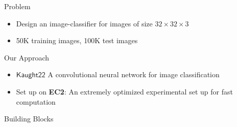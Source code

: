 \documentclass[20pt]{beamer}
\newlength{\startsepwidth}
\newlength{\sepwid}
\newlength{\onecolwid}
\newcommand*{\K}{\ensuremath{\mathsf{Kaught22}}}
\begin{document}
\begin{frame}[t] %

\begin{columns}[t] %

\begin{column}{\startsepwidth}\end{column} %

\begin{column}{\onecolwid} %

\begin{block}{Problem}

\begin{itemize}
	\item Design an image-classifier for images of size $32\times 32\times 3$
	\item 50K training images, 100K test images
\end{itemize}

\medskip
\medskip
\smallskip

\begin{alertblock}{Our Approach}
\begin{itemize}
\item \textbf{$\K$}
 A convolutional neural network for image classification
\item Set up on \textbf{EC2}: An extremely optimized experimental set up for fast computation
\end{itemize}
\end{alertblock}

\end{block}
\begin{block}{Building Blocks}
	

\end{block}
\end{column}
\end{columns}
\end{frame}
\end{document}
